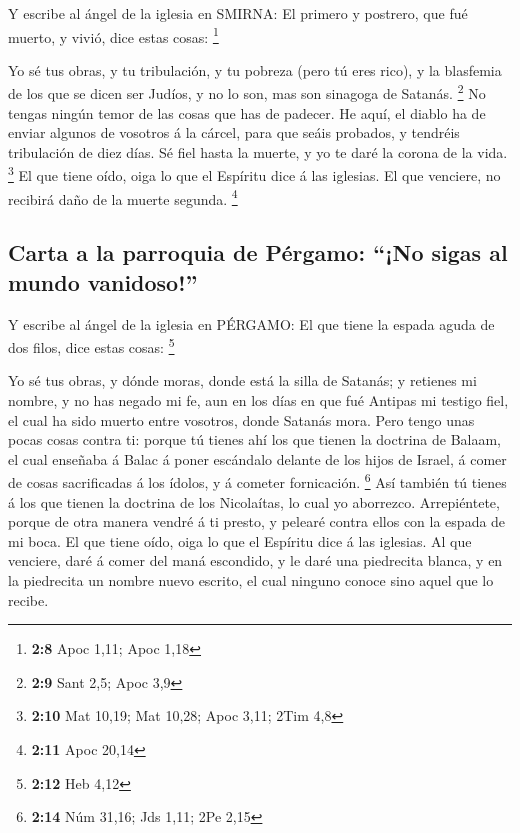  Y escribe al ángel de la iglesia en SMIRNA: El primero y
postrero, que fué muerto, y vivió, dice estas cosas: \footnote{\textbf{2:8}
  Apoc 1,11; Apoc 1,18}

 Yo sé tus obras, y tu tribulación, y tu pobreza (pero tú
eres rico), y la blasfemia de los que se dicen ser Judíos, y no lo son,
mas son sinagoga de Satanás. \footnote{\textbf{2:9} Sant 2,5; Apoc 3,9}
 No tengas ningún temor de las cosas que has de padecer. He
aquí, el diablo ha de enviar algunos de vosotros á la cárcel, para que
seáis probados, y tendréis tribulación de diez días. Sé fiel hasta la
muerte, y yo te daré la corona de la vida. \footnote{\textbf{2:10} Mat
  10,19; Mat 10,28; Apoc 3,11; 2Tim 4,8}  El que tiene
oído, oiga lo que el Espíritu dice á las iglesias. El que venciere, no
recibirá daño de la muerte segunda. \footnote{\textbf{2:11} Apoc 20,14}

\hypertarget{carta-a-la-parroquia-de-puxe9rgamo-no-sigas-al-mundo-vanidoso}{%
\subsection{Carta a la parroquia de Pérgamo: ``¡No sigas al mundo
vanidoso!''}\label{carta-a-la-parroquia-de-puxe9rgamo-no-sigas-al-mundo-vanidoso}}

 Y escribe al ángel de la iglesia en PÉRGAMO: El que tiene
la espada aguda de dos filos, dice estas cosas: \footnote{\textbf{2:12}
  Heb 4,12}

 Yo sé tus obras, y dónde moras, donde está la silla de
Satanás; y retienes mi nombre, y no has negado mi fe, aun en los días en
que fué Antipas mi testigo fiel, el cual ha sido muerto entre vosotros,
donde Satanás mora.  Pero tengo unas pocas cosas contra ti:
porque tú tienes ahí los que tienen la doctrina de Balaam, el cual
enseñaba á Balac á poner escándalo delante de los hijos de Israel, á
comer de cosas sacrificadas á los ídolos, y á cometer fornicación.
\footnote{\textbf{2:14} Núm 31,16; Jds 1,11; 2Pe 2,15}  Así
también tú tienes á los que tienen la doctrina de los Nicolaítas, lo
cual yo aborrezco.  Arrepiéntete, porque de otra manera
vendré á ti presto, y pelearé contra ellos con la espada de mi boca.
 El que tiene oído, oiga lo que el Espíritu dice á las
iglesias. Al que venciere, daré á comer del maná escondido, y le daré
una piedrecita blanca, y en la piedrecita un nombre nuevo escrito, el
cual ninguno conoce sino aquel que lo recibe.

